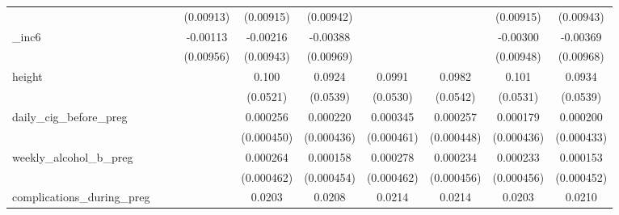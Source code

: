 \begin{table}[htbp]
\begin{tabular}{l*{9}{c}}
            &                     &                     &   (0.00913)         &   (0.00915)         &   (0.00942)         &                     &                     &   (0.00915)         &   (0.00943)         \\
[1em]
\_inc6       &                     &                     &    -0.00113         &    -0.00216         &    -0.00388         &                     &                     &    -0.00300         &    -0.00369         \\
            &                     &                     &   (0.00956)         &   (0.00943)         &   (0.00969)         &                     &                     &   (0.00948)         &   (0.00968)         \\
[1em]
height      &                     &                     &                     &       0.100\sym{*}  &      0.0924\sym{*}  &      0.0991\sym{*}  &      0.0982\sym{*}  &       0.101\sym{*}  &      0.0934\sym{*}  \\
            &                     &                     &                     &    (0.0521)         &    (0.0539)         &    (0.0530)         &    (0.0542)         &    (0.0531)         &    (0.0539)         \\
[1em]
daily\_cig\_before\_preg&                     &                     &                     &    0.000256         &    0.000220         &    0.000345         &    0.000257         &    0.000179         &    0.000200         \\
            &                     &                     &                     &  (0.000450)         &  (0.000436)         &  (0.000461)         &  (0.000448)         &  (0.000436)         &  (0.000433)         \\
[1em]
weekly\_alcohol\_b\_preg&                     &                     &                     &    0.000264         &    0.000158         &    0.000278         &    0.000234         &    0.000233         &    0.000153         \\
            &                     &                     &                     &  (0.000462)         &  (0.000454)         &  (0.000462)         &  (0.000456)         &  (0.000456)         &  (0.000452)         \\
[1em]
complications\_during\_preg&                     &                     &                     &      0.0203\sym{***}&      0.0208\sym{***}&      0.0214\sym{***}&      0.0214\sym{***}&      0.0203\sym{***}&      0.0210\sym{***}\\

\end{tabular}
\end{table}
